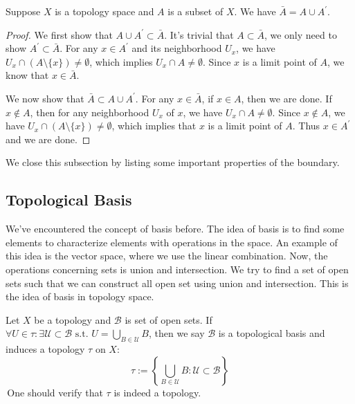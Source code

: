 \begin{theorem} \label{thm: closure_decomposition_II}
    Suppose $X$ is a topology space and $A$ is a subset of $X$. We have
    $\bar{A} = A \cup A^{\prime}.$
\end{theorem}
\begin{proof}
    We first show that $A \cup A^{\prime} \subset \bar{A}$. It's trivial that $A \subset \bar{A}$, we only need to show $A^{\prime} \subset \bar{A}$. 
    For any $x \in A^{\prime}$ and its neighborhood $U_x$, we have $U_x \cap (A\setminus \{x\}) \neq \emptyset$, which implies $U_x \cap A \neq \emptyset$. 
    Since $x$ is a limit point of $A$, we know that $x \in \bar{A}$.

    We now show that $\bar{A} \subset A \cup A^{\prime}$. For any $x \in \bar{A}$, if $x \in A$, then we are done. If $x \notin A$, then for any neighborhood $U_x$ of $x$, we have $U_x \cap A \neq \emptyset$. Since $x \notin A$, we have $U_x \cap (A\setminus \{x\}) \neq \emptyset$, which implies that $x$ is a limit point of $A$. Thus $x \in A^{\prime}$ and we are done.
\end{proof}

We close this subsection by listing some important properties of the boundary.


\subsection{Topological Basis}
We've encountered the concept of basis before. The idea of basis is to find some elements to characterize elements with operations in the space. 
An example of this idea is the vector space, where we use the linear combination. Now, the operations concerning sets is union and intersection. 
We try to find a set of open sets such that we can construct all open set using union and intersection. This is the idea of basis in topology space.
\begin{definition}[Basis]
    Let $X$ be a topology and $\mathcal{B}$ is set of open sets. If $\forall U \in \tau: \exists \mathcal{U} \subset \mathcal{B} \text{ s.t. } U = \bigcup_{B\in \mathcal{U}} B$, then we say $\mathcal{B}$ is a topological basis and
     induces a topology $\tau$ on $X$:
     \begin{equation} \label{equ: induced_top}
        \tau := \left\{\bigcup_{B \in \mathcal{U}} B : \mathcal{U} \subset \mathcal{B}\right\}
     \end{equation}
\,One should verify that $\tau$ is indeed a topology. 
\end{definition}

